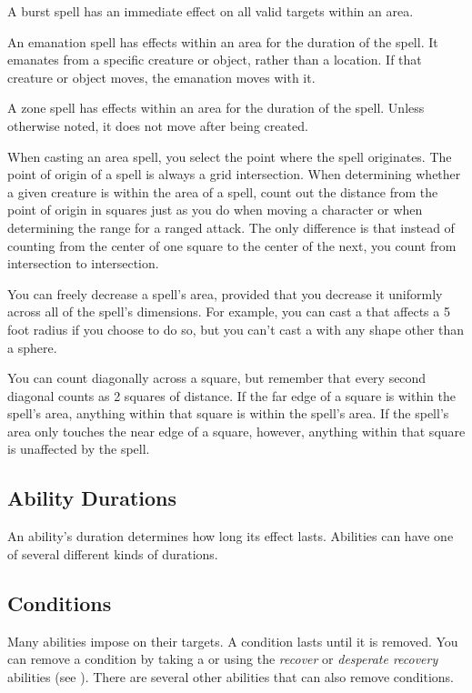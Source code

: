              A burst spell has an immediate effect on all valid targets within an area.

             An emanation spell has effects within an area for the duration of the spell.
            It emanates from a specific creature or object, rather than a location.
            If that creature or object moves, the emanation moves with it.

             A zone spell has effects within an area for the duration of the spell.
            Unless otherwise noted, it does not move after being created.


        When casting an area spell, you select the point where the spell originates.
        The point of origin of a spell is always a grid intersection.
        When determining whether a given creature is within the area of a spell, count out the distance from the point of origin in squares just as you do when moving a character or when determining the range for a ranged attack.
        The only difference is that instead of counting from the center of one square to the center of the next, you count from intersection to intersection.

        You can freely decrease a spell's area, provided that you decrease it uniformly across all of the spell's dimensions.
        For example, you can cast a  that affects a 5 foot radius if you choose to do so, but you can't cast a  with any shape other than a sphere.

        You can count diagonally across a square, but remember that every second diagonal counts as 2 squares of distance.
        If the far edge of a square is within the spell's area, anything within that square is within the spell's area.
        If the spell's area only touches the near edge of a square, however, anything within that square is unaffected by the spell.

    \subsection{Ability Durations}

        An ability's duration determines how long its effect lasts.
        Abilities can have one of several different kinds of durations.

        \subsection{Conditions}\label{Conditions}
            Many abilities impose  on their targets.
            A condition lasts until it is removed.
            You can remove a condition by taking a  or using the \textit{recover} or \textit{desperate recovery} abilities (see ).
            There are several other abilities that can also remove conditions.

